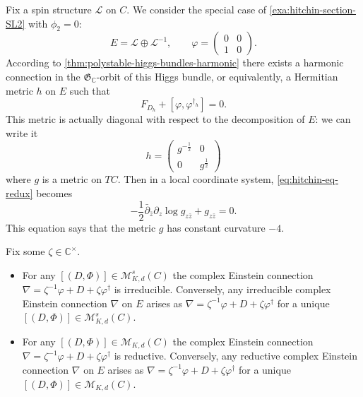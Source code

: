 \documentclass[12pt,letterpaper,reqno]{article}
\numberwithin{equation}{section}
\newcommand{\fG}{{\mathfrak G}}
\newcommand{\cL}{\ensuremath{\mathcal L}}
\newcommand{\cM}{\ensuremath{\mathcal M}}
\newcommand{\C}{\ensuremath{\mathbb C}}
\newcommand{\half}{\ensuremath{\frac{1}{2}}}
\begin{document}
\begin{example} Fix a spin 
structure $\cL$ on $C$. We consider the special case of
\autoref{exa:hitchin-section-SL2} with $\phi_2 = 0$:
\begin{equation}
  E = \cL \oplus \cL^{-1}, \qquad \varphi = \begin{pmatrix} 0 & 0 \\ 1 &0 \end{pmatrix}.
\end{equation}
According to \autoref{thm:polystable-higgs-bundles-harmonic}
there exists a harmonic connection in the $\fG_\C$-orbit of this
Higgs bundle, or equivalently, a Hermitian metric $h$ on $E$ such that
\begin{equation} \label{eq:hitchin-eq-redux}
  F_{D_h} + [\varphi, \varphi^{\dagger_h}] = 0.
\end{equation}
This metric is actually diagonal with respect to the decomposition of $E$:
we can write it
\begin{equation}
  h = \begin{pmatrix} g^{-\half} & 0 \\ 0 & g^\half \end{pmatrix}
\end{equation}
where $g$ is a metric on $TC$. Then in a local coordinate system,
\eqref{eq:hitchin-eq-redux} becomes
\begin{equation}
  -\half \bar\partial_{\bar z} \partial_z \log g_{z \bar{z}} + g_{z \bar{z}} = 0.
\end{equation}
This equation says that the metric $g$ has constant curvature
$-4$.

\end{example}


\begin{thm} \label{thm:reductive-connection-harmonic}
Fix some $\zeta \in \C^\times$.
\begin{itemize}
\item For any $[(D,\Phi)] \in \cM^s_{K,d}(C)$ the complex Einstein
connection $\nabla = \zeta^{-1} \varphi + D + \zeta \varphi^\dagger$ 
is irreducible.
Conversely, any irreducible complex Einstein connection
$\nabla$ on $E$ arises 
as $\nabla = \zeta^{-1} \varphi + D + \zeta \varphi^\dagger$ 
for a unique $[(D,\Phi)] \in \cM^s_{K,d}(C)$.
\item For any $[(D,\Phi)] \in \cM_{K,d}(C)$ the complex Einstein
connection $\nabla = \zeta^{-1} \varphi + D + \zeta \varphi^\dagger$ 
is reductive.
Conversely, any reductive complex Einstein connection
$\nabla$ on $E$ arises 
as $\nabla = \zeta^{-1} \varphi + D + \zeta \varphi^\dagger$ 
for a unique $[(D,\Phi)] \in \cM_{K,d}(C)$.
\end{itemize}
\end{thm}
\end{document}
